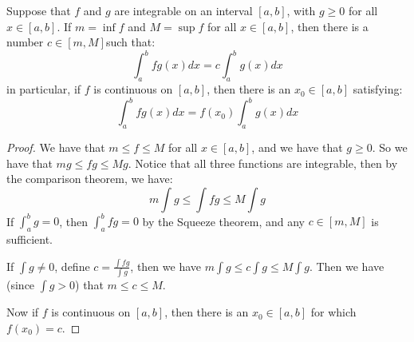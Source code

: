\begin{theorem}\label{5.2.7}
    Suppose that $f$ and  $g$ are integrable on an interval  $[a,b]$, with $g \geq 0$ for all  $x
\in [a,b]$. If $m=\inf{f}$ and $M=\sup{f}$ for all $x \in [a,b]$, then there is a number $c
\in [m,M]$such that:
    \begin{equation}
        \int_{a}^{b}{fg(x)} dx=c\int_{a}^{b}{g(x)} dx
    \end{equation} 
in particular, if $f$ is continuous on  $[a,b]$, then there is an $ x_0 \in [a,b]$ satisfying:
    \begin{equation}
        \int_{a}^{b}{fg(x)} dx=f(x_0)\int_{a}^{b}{g(x)} dx
    \end{equation} 
\end{theorem}
\begin{proof}
    We have that $m \leq f \leq M$ for all  $x \in [a,b]$, and we have that $g \geq 0$. So we have
    that  $mg \leq fg \leq Mg$. Notice that all three functions are integrable, then by the
    comparison theorem, we have:
        \begin{equation*}
            m\int{g} \leq \int{fg} \leq M\int{g}
        \end{equation*}
    If $\int_{a}^{b}{g}=0$, then $\int_{a}^{b}{fg}=0$ by the Squeeze theorem, and any $c \in [m,M]$
    is sufficient.

    If $\int{g} \neq 0$, define $c=\frac{\int{fg}}{\int{g}}$, then we have $m\int{g} \leq c\int{g}
\leq M\int{g}$. Then we have (since $\int{g}>0$) that $m \leq c \leq M$.

Now if  $f$ is continuous on  $[a,b]$, then there is an $x_0 \in [a,b]$ for which $ f(x_0)=c$.
\end{proof}
